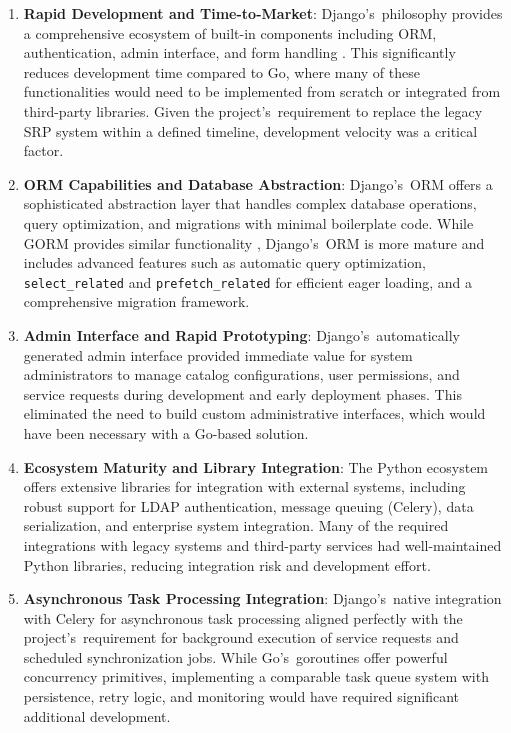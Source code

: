 \begin{enumerate}
\item \textbf{Rapid Development and Time-to-Market}: Django's~philosophy provides a comprehensive ecosystem of built-in components including ORM, authentication, admin interface, and form handling \cite{django}. This significantly reduces development time compared to Go, where many of these functionalities would need to be implemented from scratch or integrated from third-party libraries. Given the project's~requirement to replace the legacy SRP system within a defined timeline, development velocity was a critical factor.

\item \textbf{ORM Capabilities and Database Abstraction}: Django's~ORM offers a sophisticated abstraction layer that handles complex database operations, query optimization, and migrations with minimal boilerplate code. While GORM provides similar functionality \cite{gorm}, Django's~ORM is more mature and includes advanced features such as automatic query optimization, \texttt{select\_related} and \texttt{prefetch\_related} for efficient eager loading, and a comprehensive migration framework. 

\item \textbf{Admin Interface and Rapid Prototyping}: Django's~automatically generated admin interface provided immediate value for system administrators to manage catalog configurations, user permissions, and service requests during development and early deployment phases. This eliminated the need to build custom administrative interfaces, which would have been necessary with a Go-based solution.

\item \textbf{Ecosystem Maturity and Library Integration}: The Python ecosystem offers extensive libraries for integration with external systems, including robust support for LDAP authentication, message queuing (Celery), data serialization, and enterprise system integration. Many of the required integrations with legacy systems and third-party services had well-maintained Python libraries, reducing integration risk and development effort.

\item \textbf{Asynchronous Task Processing Integration}: Django's~native integration with Celery for asynchronous task processing aligned perfectly with the project's~requirement for background execution of service requests and scheduled synchronization jobs. While Go's~goroutines offer powerful concurrency primitives, implementing a comparable task queue system with persistence, retry logic, and monitoring would have required significant additional development.
\end{enumerate}

